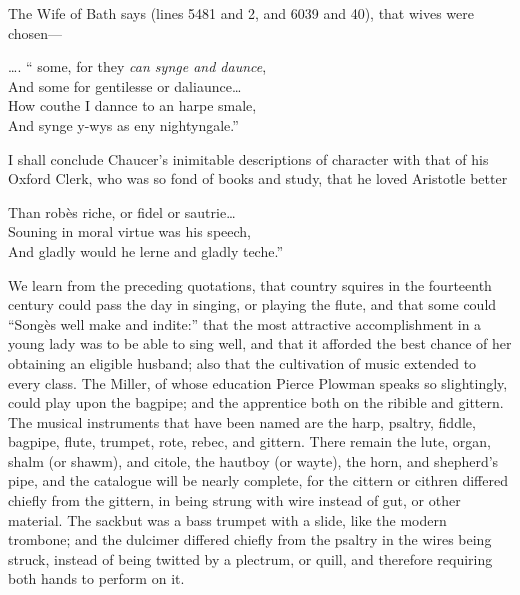\settowidth{\versewidth}{\ldots . “some, for they can synge and daunce,}

The Wife of Bath says (lines 5481 and 2, and 6039 and 40), that wives were
chosen—
\begin{scverse}\ldots . “	some, for they \textit{can synge and daunce},\\
And some for gentilesse or daliaunce\ldots \\
How couthe I dannce to an harpe smale,\\
And synge y-wys as eny nightyngale.”
\end{scverse}
I shall conclude Chaucer’s inimitable descriptions of character with that of his
Oxford Clerk, who was so fond of books and study, that he loved Aristotle better
\begin{scverse}Than robès riche, or fidel or sautrie\ldots \\
Souning in moral virtue was his speech,\\
And gladly would he lerne and gladly teche.”
\end{scverse}
We learn from the preceding quotations, that country squires in the fourteenth
century could pass the day in singing, or playing the flute, and that some could
“Songès well make and indite:” that the most attractive accomplishment in
a young lady was to be able to sing well, and that it afforded the best chance of
her obtaining an eligible husband; also that the cultivation of music extended
to every class. The Miller, of whose education Pierce Plowman speaks so slightingly,
could play upon the bagpipe; and the apprentice both on the ribible and
gittern. The musical instruments that have been named are the harp, psaltry,
fiddle, bagpipe, flute, trumpet, rote, rebec, and gittern. There remain the lute,
organ, shalm (or shawm), and citole, the hautboy (or wayte), the horn, and
shepherd’s pipe, and the catalogue will be nearly complete, for the cittern or
cithren differed chiefly from the gittern, in being strung with wire instead of gut,
or other material. The sackbut was a bass trumpet with a slide, like the modern
trombone; and the dulcimer differed chiefly from the psaltry in the wires being
struck, instead of being twitted by a plectrum, or quill, and therefore requiring
both hands to perform on it.

